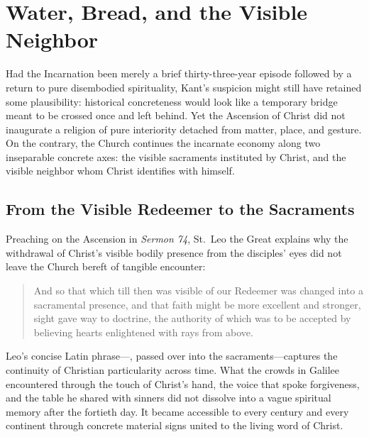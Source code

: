 \section{Water, Bread, and the Visible Neighbor}

Had the Incarnation been merely a brief thirty-three-year episode followed by a return to pure disembodied spirituality, Kant's suspicion might still have retained some plausibility: historical concreteness would look like a temporary bridge meant to be crossed once and left behind. Yet the Ascension of Christ did not inaugurate a religion of pure interiority detached from matter, place, and gesture. On the contrary, the Church continues the incarnate economy along two inseparable concrete axes: the visible sacraments instituted by Christ, and the visible neighbor whom Christ identifies with himself.

\subsection{From the Visible Redeemer to the Sacraments}

Preaching on the Ascension in \textit{Sermon 74}, St.\ Leo the Great explains why the withdrawal of Christ's visible bodily presence from the disciples' eyes did not leave the Church bereft of tangible encounter:

\begin{quote}
And so that which till then was visible of our Redeemer was changed into a sacramental presence, and that faith might be more excellent and stronger, sight gave way to doctrine, the authority of which was to be accepted by believing hearts enlightened with rays from above.
\end{quote}

Leo's concise Latin phrase---, passed over into the sacraments---captures the continuity of Christian particularity across time. What the crowds in Galilee encountered through the touch of Christ's hand, the voice that spoke forgiveness, and the table he shared with sinners did not dissolve into a vague spiritual memory after the fortieth day. It became accessible to every century and every continent through concrete material signs united to the living word of Christ.


